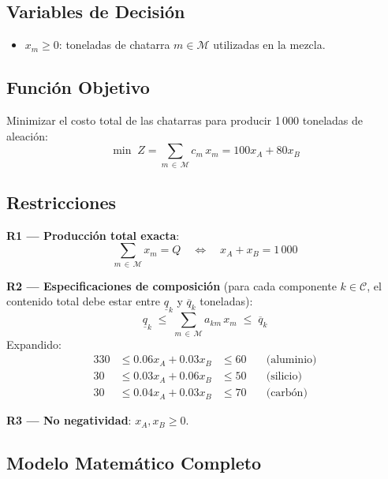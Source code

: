 \documentclass[12pt,a4paper]{article}
\newcommand{\cset}[1]{\mathcal{#1}}            %
\begin{document}
\subsection{Variables de Decisión}

\begin{varbox}
\begin{itemize}[leftmargin=1.5em]
  \item $x_m \geq 0$: toneladas de chatarra $m \in \mathcal{M}$ utilizadas en la mezcla.
\end{itemize}
\end{varbox}

\subsection{Función Objetivo}

\begin{fobox}
Minimizar el costo total de las chatarras para producir 1\,000 toneladas de aleación:
\[
  \min\; Z = \sum_{m\,\in\,\cset{M}} c_m\,x_m = 100x_A + 80x_B
\]
\end{fobox}

\subsection{Restricciones}

\begin{restbox}
\textbf{R1 — Producción total exacta}:
\[
  \sum_{m\,\in\,\cset{M}} x_m = Q
  \quad\Leftrightarrow\quad x_A + x_B = 1\,000
\]

\textbf{R2 — Especificaciones de composición}
(para cada componente $k \in \cset{C}$, el contenido total debe
estar entre $\underline{q}_k$ y $\overline{q}_k$ toneladas):
\[
  \underline{q}_k \;\leq\; \sum_{m\,\in\,\cset{M}} a_{km}\,x_m \;\leq\; \overline{q}_k
\]
Expandido:
\begin{alignat*}{3}
  30 &\leq 0.06x_A + 0.03x_B &\leq 60 \quad& \text{(aluminio)}\\
  30 &\leq 0.03x_A + 0.06x_B &\leq 50 \quad& \text{(silicio)}\\
  30 &\leq 0.04x_A + 0.03x_B &\leq 70 \quad& \text{(carbón)}
\end{alignat*}

\textbf{R3 — No negatividad}: $x_A, x_B \geq 0$.
\end{restbox}

\subsection{Modelo Matemático Completo}
\end{document}
